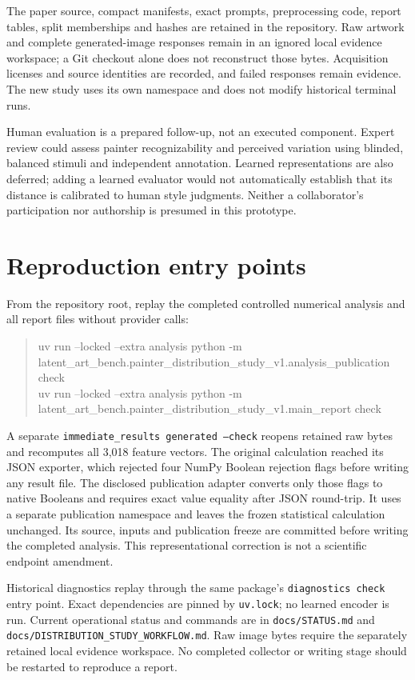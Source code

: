 \documentclass[11pt]{article}
\begin{document}
The paper source, compact manifests, exact prompts, preprocessing code, report
tables, split memberships and hashes are retained in the repository. Raw artwork
and complete generated-image responses remain in an ignored local evidence
workspace; a Git checkout alone does not reconstruct those bytes. Acquisition
licenses and source identities are recorded, and failed responses remain evidence.
The new study uses its own namespace and does not modify historical terminal runs.

Human evaluation is a prepared follow-up, not an executed component. Expert
review could assess painter recognizability and perceived variation using blinded,
balanced stimuli and independent annotation. Learned representations are also
deferred; adding a learned evaluator would not automatically establish that its
distance is calibrated to human style judgments. Neither a collaborator's
participation nor authorship is presumed in this prototype.

\appendix
\section{Reproduction entry points}
From the repository root, replay the completed controlled numerical analysis and
all report files without provider calls:
\begin{quote}\small\ttfamily
uv run --locked --extra analysis python -m\\
latent\_art\_bench.painter\_distribution\_study\_v1.analysis\_publication check\\[4pt]
uv run --locked --extra analysis python -m\\
latent\_art\_bench.painter\_distribution\_study\_v1.main\_report check
\end{quote}
A separate \texttt{immediate\_results generated --check} reopens retained raw bytes
and recomputes all 3,018 feature vectors. The original calculation reached its
JSON exporter, which rejected four NumPy Boolean rejection flags before writing
any result file. The disclosed publication adapter converts only those flags to
native Booleans and requires exact value equality after JSON round-trip. It uses
a separate publication namespace and leaves the frozen statistical calculation
unchanged. Its source, inputs and publication freeze are committed before writing
the completed analysis. This representational correction is not a scientific
endpoint amendment.

Historical diagnostics replay through the same package's \texttt{diagnostics check}
entry point. Exact dependencies are pinned by \texttt{uv.lock}; no learned encoder
is run. Current operational status and commands are in \texttt{docs/STATUS.md} and
\texttt{docs/DISTRIBUTION\_STUDY\_WORKFLOW.md}. Raw image bytes require the separately
retained local evidence workspace. No completed collector or writing stage should
be restarted to reproduce a report.


{
}
\end{document}
